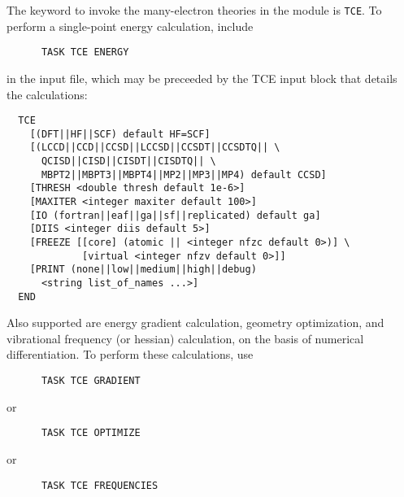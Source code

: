 The keyword to invoke the many-electron theories in the module is
\verb+TCE+.  To perform a single-point energy calculation, include
\begin{verbatim}
      TASK TCE ENERGY
\end{verbatim}
in the input file, which may be preceeded by the TCE input block
that details the calculations:
\begin{verbatim}
  TCE
    [(DFT||HF||SCF) default HF=SCF]
    [(LCCD||CCD||CCSD||LCCSD||CCSDT||CCSDTQ|| \
      QCISD||CISD||CISDT||CISDTQ|| \
      MBPT2||MBPT3||MBPT4||MP2||MP3||MP4) default CCSD]
    [THRESH <double thresh default 1e-6>]
    [MAXITER <integer maxiter default 100>]
    [IO (fortran||eaf||ga||sf||replicated) default ga]
    [DIIS <integer diis default 5>]
    [FREEZE [[core] (atomic || <integer nfzc default 0>)] \
             [virtual <integer nfzv default 0>]]
    [PRINT (none||low||medium||high||debug)
      <string list_of_names ...>]
  END
\end{verbatim}
Also supported are energy gradient calculation, geometry optimization,
and vibrational frequency (or hessian) calculation, on the basis of
numerical differentiation.  To perform these calculations, use
\begin{verbatim}
      TASK TCE GRADIENT
\end{verbatim}
or
\begin{verbatim}
      TASK TCE OPTIMIZE
\end{verbatim}
or
\begin{verbatim}
      TASK TCE FREQUENCIES
\end{verbatim}

